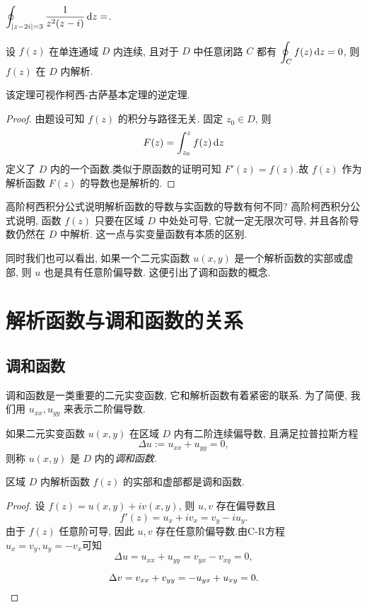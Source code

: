\begin{exercise}
	$\displaystyle\oint_{|z-2i|=3}\frac1{z^2(z-i)}\,\mathrm{d} z=$.
\end{exercise}

\begin{example}[莫累拉定理]
	设 $f(z)$ 在单连通域 $D$ 内连续, 且对于 $D$ 中任意闭路 $C$ 都有 $\displaystyle\oint_Cf(z)\,\mathrm{d} z=0$, 则 $f(z)$ 在 $D$ 内解析.
\end{example}

该定理可视作柯西-古萨基本定理的逆定理.

\begin{proof}
	由题设可知 $f(z)$ 的积分与路径无关.
	固定 $z_0\in D$, 则
		\[F(z)=\int_{z_0}^zf(z)\,\mathrm{d} z\]
	定义了 $D$ 内的一个函数.类似于原函数的证明可知 $F'(z)=f(z)$.故 $f(z)$ 作为解析函数 $F(z)$ 的导数也是解析的.
\end{proof}

高阶柯西积分公式说明解析函数的导数与实函数的导数有何不同?
高阶柯西积分公式说明, 函数 $f(z)$ 只要在区域 $D$ 中处处可导, 它就一定无限次可导, 并且各阶导数仍然在 $D$ 中解析.
\alert{这一点与实变量函数有本质的区别.}

同时我们也可以看出, 如果一个二元实函数 $u(x,y)$ 是一个解析函数的实部或虚部, 则 $u$ 也是具有任意阶偏导数.
这便引出了调和函数的概念.

\section{解析函数与调和函数的关系}

\subsection{调和函数}

调和函数是一类重要的二元实变函数, 它和解析函数有着紧密的联系.
为了简便, 我们用 $u_{xx},u_{yy}$ 来表示二阶偏导数.

\begin{definition}
	如果二元实变函数 $u(x,y)$ 在区域 $D$ 内有二阶连续偏导数, 且满足拉普拉斯方程
	\[\Delta u:=u_{xx}+u_{yy}=0,\]
	则称 $u(x,y)$ 是 $D$ 内的\emph{调和函数}.
\end{definition}

\begin{theorem}
	区域 $D$ 内解析函数 $f(z)$ 的实部和虚部都是调和函数.
\end{theorem}

\begin{proof}
	设 $f(z)=u(x,y)+iv(x,y)$, 则 $u,v$ 存在偏导数且
		\[f'(z)=u_x+iv_x=v_y-iu_y.\]
	{由于 $f(z)$ 任意阶可导, 因此 $u,v$ 存在任意阶偏导数.由C-R方程 $u_x=v_y,u_y=-v_x$可知
		\[\Delta u=u_{xx}+u_{yy}=v_{yx}-v_{xy}=0,\]}

	{
		\[\Delta v=v_{xx}+v_{yy}=-u_{yx}+u_{xy}=0.\qedhere\]}
\end{proof}

